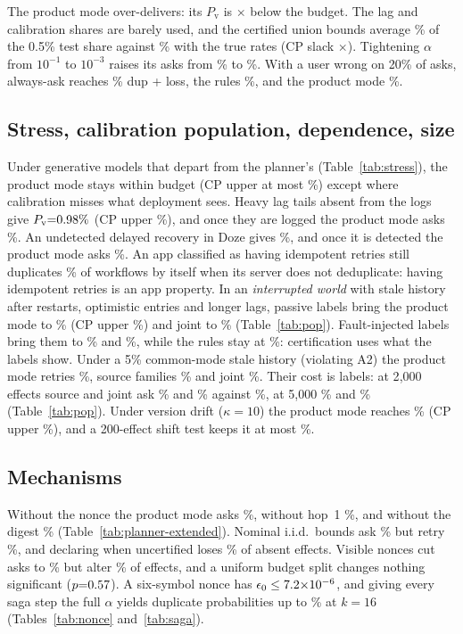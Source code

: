 The product mode over-delivers: its $P_{\mathrm{v}}$ is \SimBudgetRatio$\times$ below the budget. The lag and calibration shares are barely used, and the certified
union bounds average \DecompBcp\% of the 0.5\% test share against \DecompBtrue\% with the true rates (CP slack \DecompCPratio$\times$). Tightening $\alpha$ from $10^{-1}$ to $10^{-3}$
raises its asks from \SweepAskLo\% to \SweepAskHi\%. With a user wrong on 20\% of asks, always-ask reaches \UserAskAllTwenty\% dup + loss, the rules \UserRulesTwenty\%, and
the product mode \UserGhostTwenty\%.

\subsection{Stress, calibration population, dependence, size}
\label{sec:eval-stress}\label{sec:eval-pop}
Under generative models that depart from the planner's (Table~\ref{tab:stress}), the product mode stays within budget (CP upper at most \StressMaxHi\%) except where
calibration misses what deployment sees. Heavy lag tails absent from the logs give $P_{\mathrm{v}}{=}0.98\%$ (CP upper \StressLagHi\%), and once they are logged the product mode asks \StressLagCalAsk\%.
An undetected delayed recovery in Doze gives \StressDoze\%, and once it is detected the product mode asks \StressDozeAsk\%. An app classified as having idempotent retries
still duplicates \StressNodedupDup\% of workflows by itself when its server does not deduplicate: having idempotent retries is an app property. In an \emph{interrupted world} with stale history after restarts, optimistic entries and longer lags,
passive labels bring the product mode to \PopIwPProd\% (CP upper \PopIwPProdHi\%) and joint to \PopIwPJoint\% (Table~\ref{tab:pop}). Fault-injected labels bring them to \PopIwFProd\% and \PopIwFJoint\%, while the
rules stay at \PopIwFRules\%: certification uses what the labels show. Under a 5\% common-mode stale history (violating A2) the product mode retries \PopCmCProd\%, source
families \PopCmCSrc\% and joint \PopCmCJoint\%. Their cost is labels: at 2{,}000 effects source and joint ask \NcalESrcAsk\% and \NcalEJointAsk\% against \NcalEProdAsk\%,
at 5{,}000 \NcalFSrcAsk\% and \NcalFJointAsk\% (Table~\ref{tab:pop}). Under version drift ($\kappa{=}10$) the product mode reaches \DriftTenPv\% (CP upper \DriftTenPvHi\%), and a
200-effect shift test keeps it at most \DriftTenTestPvHi\%.

\subsection{Mechanisms}
\label{sec:eval-mech}
Without the nonce the product mode asks \SimNoNonceAsk\%, without hop~1 \SimNoHopAsk\%, and without the digest \SimNoDigestAsk\% (Table~\ref{tab:planner-extended}). Nominal i.i.d.\
bounds ask \SimNoCalAsk\% but retry \SimNoCalPv\%, and declaring when uncertified loses \SimNoAskLv\% of absent effects. Visible nonces cut asks to \SimVisAsk\% but alter
\SimAltered\% of effects, and a uniform budget split changes nothing significant ($p{=}0.57$). A six-symbol nonce has $\epsilon_0\le7.2{\times}10^{-6}$, and giving every saga step the
full $\alpha$ yields duplicate probabilities up to \SagaNaiveSixteen\% at $k{=}16$ (Tables~\ref{tab:nonce} and~\ref{tab:saga}).
